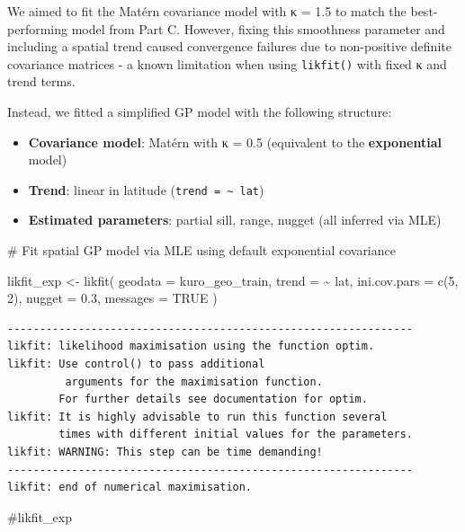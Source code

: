 \documentclass[
  11pt,
]{article}
\newenvironment{Shaded}{\begin{snugshade}}{\end{snugshade}}
\newcommand{\AttributeTok}[1]{\textcolor[rgb]{0.40,0.45,0.13}{#1}}
\newcommand{\CommentTok}[1]{\textcolor[rgb]{0.37,0.37,0.37}{#1}}
\newcommand{\ConstantTok}[1]{\textcolor[rgb]{0.56,0.35,0.01}{#1}}
\newcommand{\DecValTok}[1]{\textcolor[rgb]{0.68,0.00,0.00}{#1}}
\newcommand{\FloatTok}[1]{\textcolor[rgb]{0.68,0.00,0.00}{#1}}
\newcommand{\FunctionTok}[1]{\textcolor[rgb]{0.28,0.35,0.67}{#1}}
\newcommand{\NormalTok}[1]{\textcolor[rgb]{0.00,0.23,0.31}{#1}}
\newcommand{\OtherTok}[1]{\textcolor[rgb]{0.00,0.23,0.31}{#1}}
\newcommand{\SpecialCharTok}[1]{\textcolor[rgb]{0.37,0.37,0.37}{#1}}
\begin{document}
We aimed to fit the Matérn covariance model with κ = 1.5 to match the
best-performing model from Part C. However, fixing this smoothness
parameter and including a spatial trend caused convergence failures due
to non-positive definite covariance matrices - a known limitation when
using \texttt{likfit()} with fixed κ and trend terms.

Instead, we fitted a simplified GP model with the following structure:

\begin{itemize}
\item
  \textbf{Covariance model}: Matérn with κ = 0.5 (equivalent to the
  \textbf{exponential} model)
\item
  \textbf{Trend}: linear in latitude
  (\texttt{trend\ =\ \textasciitilde{}\ lat})
\item
  \textbf{Estimated parameters}: partial sill, range, nugget (all
  inferred via MLE)
\end{itemize}

\begin{Shaded}
\begin{Highlighting}[]
\CommentTok{\# Fit spatial GP model via MLE using default exponential covariance}

\NormalTok{likfit\_exp }\OtherTok{\textless{}{-}} \FunctionTok{likfit}\NormalTok{(}
  \AttributeTok{geodata =}\NormalTok{ kuro\_geo\_train,}
  \AttributeTok{trend =} \SpecialCharTok{\textasciitilde{}}\NormalTok{ lat,}
  \AttributeTok{ini.cov.pars =} \FunctionTok{c}\NormalTok{(}\DecValTok{5}\NormalTok{, }\DecValTok{2}\NormalTok{),}
  \AttributeTok{nugget =} \FloatTok{0.3}\NormalTok{,}
  \AttributeTok{messages =} \ConstantTok{TRUE}
\NormalTok{)}
\end{Highlighting}
\end{Shaded}

\begin{verbatim}
---------------------------------------------------------------
likfit: likelihood maximisation using the function optim.
likfit: Use control() to pass additional
         arguments for the maximisation function.
        For further details see documentation for optim.
likfit: It is highly advisable to run this function several
        times with different initial values for the parameters.
likfit: WARNING: This step can be time demanding!
---------------------------------------------------------------
likfit: end of numerical maximisation.
\end{verbatim}

\begin{Shaded}
\begin{Highlighting}[]
\CommentTok{\#likfit\_exp}
\end{Highlighting}
\end{Shaded}
\end{document}

